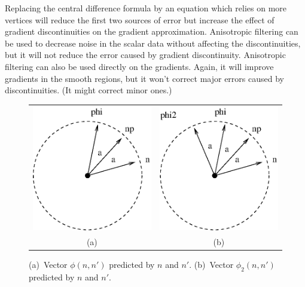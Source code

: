 Replacing the central difference formula by an equation 
which relies on more vertices will reduce the first two sources of error
but increase the effect of gradient discontinuities 
on the gradient approximation.
Anisotropic filtering can be used to decrease noise in the scalar data
without affecting the discontinuities,
but it will not reduce the error caused by gradient discontinuity.
Anisotropic filtering can also be used directly on the gradients.
Again, it will improve gradients in the smooth regions,
but it won't correct major errors caused by discontinuities.
(It might correct minor ones.)
\begin{figure}[t]
    \begin{center}
        \begin{tabular}{cc}
            \includegraphics[width=0.25\linewidth]{images/predicted.eps} \qquad &
            \qquad
            \includegraphics[width=0.25\linewidth]{images/predicted2.eps} \\
            (a) & (b)
        \end{tabular}
    \end{center}
    \caption{(a)~Vector $\phi(n,n')$ predicted by $n$ and $n'$.
        (b)~Vector $\phi_2(n,n')$ predicted by $n$ and $n'$.}
    \label{fig:predicted}
\end{figure}

